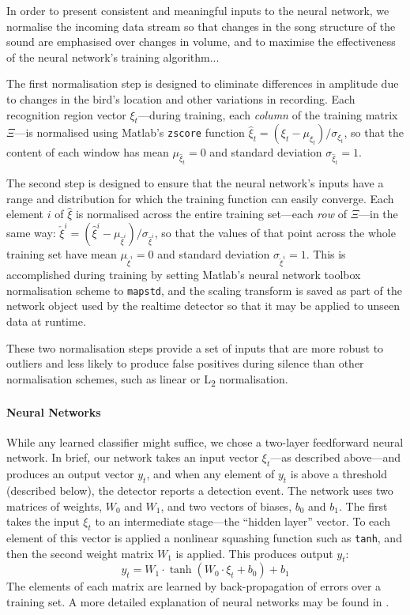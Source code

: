 \documentclass[10pt,letterpaper]{article}
\renewcommand{\subsubsection}[1]{\paragraph{#1}}
\begin{document}
In order to present consistent and meaningful inputs to the neural network, we normalise the incoming data stream so that changes in the song structure of the sound are emphasised over changes in volume, and to maximise the effectiveness of the neural network's training algorithm...

The first normalisation step is designed to eliminate differences in amplitude due to changes in the bird's location and other variations in recording.  Each recognition region vector $\xi_t$---during training, each {\em column} of the training matrix $\Xi$---is normalised using Matlab's {\tt zscore} function $\hat{\xi}_t = (\xi_t - \mu_{\xi_t}) / \sigma_{\xi_t}$, so that the content of each window has mean $\mu_{\hat{\xi}_t}=0$ and  standard deviation $\sigma_{\hat{\xi}_t}=1$.

The second step is designed to ensure that the neural network's inputs have a range and distribution for which the training function can easily converge.  Each element $i$ of $\hat{\xi}$ is normalised across the entire training set---each {\em row} of $\Xi$---in the same way: $\check{\xi}^i = (\hat{\xi}^i - \mu_{\hat{\xi}^i})/\sigma_{\hat{\xi}^i}$, so that the values of that point across the whole training set have mean $\mu_{\check{\xi}^i}=0$ and standard deviation $\sigma_{\check{\xi}^i}=1$.  This is accomplished during training by setting Matlab's neural network toolbox normalisation scheme to {\tt mapstd}, and the scaling transform is saved as part of the network object used by the realtime detector so that it may be applied to unseen data at runtime.

These two normalisation steps provide a set of inputs that are more
robust to outliers and less likely to produce false positives during 
silence than other normalisation schemes, such as 
linear or L\textsubscript{2} normalisation.

\subsubsection{Neural Networks}

While any learned classifier might suffice, we chose a two-layer feedforward neural network.  In brief, our network takes an input vector $\xi_t$---as described above---and produces an output vector $y_t$, and when any element of $y_t$ is above a threshold (described below), the detector reports a detection event.  The network uses two matrices of weights, $W_0$ and $W_1$, and two vectors of biases, $b_0$ and $b_1$.  The first takes the input $\xi_t$ to an intermediate stage---the ``hidden layer'' vector.  To each element of this vector is applied a nonlinear squashing function such as {\tt tanh}, and then the second weight matrix $W_1$ is applied.  This produces output $y_t$:
\begin{equation*}
  y_t = W_1 \cdot \tanh (W_0 \cdot \xi_t + b_0) + b_1
\end{equation*}
The elements of each matrix are learned by back-propagation of errors over a training set.  A more detailed explanation of neural networks may be found in \cite{hkp}.
\end{document}

